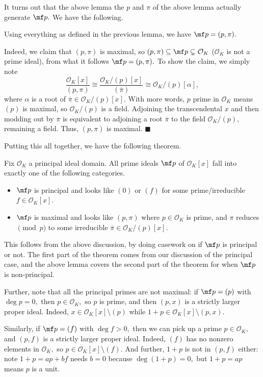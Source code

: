 It turns out that the above lemma the $p$ and $\pi$ of the above lemma actually generate $\mf p.$ We have the following.
\begin{lemma}
    Using everything as defined in the previous lemma, we have $\mf p=(p,\pi).$
\end{lemma}
Indeed, we claim that $(p,\pi)$ is maximal, so $(p,\pi)\subseteq\mf p\subsetneq\mathcal O_K$ ($\mathcal O_K$ is not a prime ideal), from what it follows $\mf p=(p,\pi).$ To show the claim, we simply note
\[\frac{\mathcal O_K[x]}{(p,\pi)}\cong\frac{\mathcal O_K/(p)[x]}{(\overline\pi)}\cong\mathcal O_K/(p)[\alpha],\]
where $\alpha$ is a root of $\overline\pi\in\mathcal O_K/(p)[x].$ With more words, $p$ prime in $\mathcal O_K$ means $(p)$ is maximal, so $\mathcal O_K/(p)$ is a field. Adjoining the transcendental $x$ and then modding out by $\overline\pi$ is equivalent to adjoining a root $\overline\pi$ to the field $\mathcal O_K/(p),$ remaining a field. Thus, $(p,\pi)$ is maximal. $\blacksquare$

Putting this all together, we have the following theorem.
\begin{theorem}
    Fix $\mathcal O_K$ a principal ideal domain. All prime ideals $\mf p$ of $\mathcal O_K[x]$ fall into exactly one of the following categories.
    \begin{itemize}
        \item $\mf p$ is principal and looks like $(0)$ or $(f)$ for some prime/irreducible $f\in\mathcal O_K[x].$
        \item $\mf p$ is maximal and looks like $(p,\pi)$ where $p\in\mathcal O_K$ is prime, and $\pi$ reduces$\pmod p$ to some irreducible $\overline\pi\in\mathcal O_K/(p)[x].$
    \end{itemize}
\end{theorem}
This follows from the above discussion, by doing casework on if $\mf p$ is principal or not. The first part of the theorem comes from our discussion of the principal case, and the above lemma covers the second part of the theorem for when $\mf p$ is non-principal.

Further, note that all the principal primes are not maximal: if $\mf p=(p)$ with $\deg p=0,$ then $p\in\mathcal O_K,$ so $p$ is prime, and then $(p,x)$ is a strictly larger proper ideal. Indeed, $x\in\mathcal O_K[x]\setminus(p)$ while $1+p\in\mathcal O_K[x]\setminus(p,x).$

Similarly, if $\mf p=(f)$ with $\deg f>0,$ then we can pick up a prime $p\in\mathcal O_K,$ and $(p,f)$ is a strictly larger proper ideal. Indeed, $(f)$ has no nonzero elements in $\mathcal O_K,$ so $p\in\mathcal O_K[x]\setminus(f).$ And further, $1+p$ is not in $(p,f)$ either: note $1+p=ap+bf$ needs $b=0$ because $\deg(1+p)=0,$ but $1+p=ap$ means $p$ is a unit.

